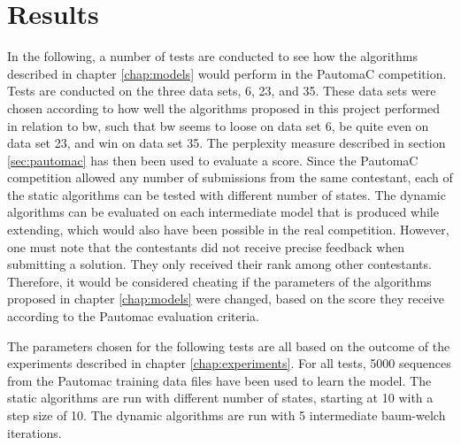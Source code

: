 \chapter{Results}
In the following, a number of tests are conducted to see how the algorithms described in chapter \ref{chap:models} would perform in the PautomaC competition. Tests are conducted on the three data sets, 6, 23, and 35. These data sets were chosen according to how well the algorithms proposed in this project performed in relation to \gls{bw}, such that \gls{bw} seems to loose on data set 6, be quite even on data set 23, and win on data set 35.
The perplexity measure described in section \ref{sec:pautomac} has then been used to evaluate a score.
Since the PautomaC competition allowed any number of submissions from the same contestant, each of the static algorithms can be tested with different number of states. The dynamic algorithms can be evaluated on each intermediate model that is produced while extending, which would also have been possible in the real competition.
However, one must note that the contestants did not receive precise feedback when submitting a solution. They only received their rank among other contestants. Therefore, it would be considered cheating if the parameters of the algorithms proposed in chapter \ref{chap:models} were changed, based on the score they receive according to the Pautomac evaluation criteria.

The parameters chosen for the following tests are all based on the outcome of the experiments described in chapter \ref{chap:experiments}.
For all tests, 5000 sequences from the Pautomac training data files have been used to learn the model. The static algorithms are run with different number of states, starting at 10 with a step size of 10.
The dynamic algorithms are run with 5 intermediate \gls{baum-welch} iterations.